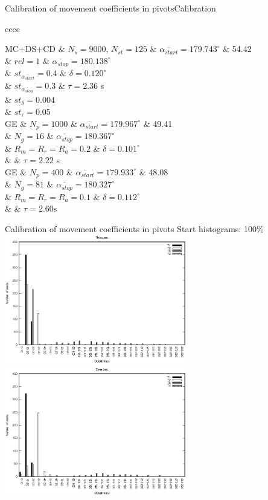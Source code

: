 \documentclass[10pt]{beamer}
\newcommand{\TABLE}[3]
{
	\begin{table}[ht!]
		\centering
		#1
		\tabulinesep=0.9mm
		\begin{tabu}{#2}
			#3
		\end{tabu}
	\end{table}
}
\begin{document}
\begin{frame}{Calibration of movement coefficients in pivots}{Calibration}
\TABLE{\tiny}{cccc}
{
	\hline
	MC+DS+CD & $N_s=9000$, $N_{st}=125$
	& $\overline{\alpha_{start}}=179.743^\circ$ & 54.42
	\\ & $rel=1$ & $\overline{\alpha_{stop}}=180.138^\circ$
	\\ & $st_{\overline{\alpha_{start}}}=0.4$ & $\delta=0.120^\circ$
	\\ & $st_{\overline{\alpha_{stop}}}=0.3$ & $\tau=2.36$ s
	\\ & $st_\delta=0.004$
	\\ & $st_\tau=0.05$
	\\ \hline
	GE & $N_p=1000$ & $\overline{\alpha_{start}}=179.967^\circ$
	& 49.41
	\\ & $N_g=16$ & $\overline{\alpha_{stop}}=180.367^\circ$
	\\ & $R_m=R_r=R_a=0.2$ & $\delta=0.101^\circ$
	\\ & & $\tau=2.22$ s
	\\ \hline
	GE & $N_p=400$ & $\overline{\alpha_{start}}=179.933^\circ$
	& 48.08
	\\ & $N_g=81$ & $\overline{\alpha_{stop}}=180.327^\circ$
	\\ & $R_m=R_r=R_a=0.1$ & $\delta=0.112^\circ$
	\\ & & $\tau=2.60$s
	\\ \hline
}
\end{frame}

\begin{frame}{Calibration of movement coefficients in pivots}
{Start histograms: 100\%}
	\includegraphics[width=0.60\textwidth]{pivot-measured-starts-100.eps}\\
	\includegraphics[width=0.60\textwidth]{pivot-simulated-starts-100.eps}
\end{frame}
\end{document}
